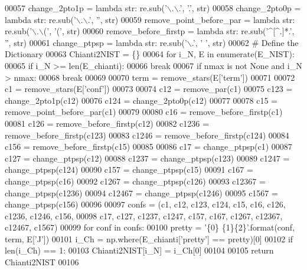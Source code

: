 \begin{DoxyCode}
00057     change\_2pto1p = \textcolor{keyword}{lambda} str: re.sub(\textcolor{stringliteral}{'\(\backslash\).\(\backslash\).'}, \textcolor{stringliteral}{'.'}, str)
00058     change\_2pto0p = \textcolor{keyword}{lambda} str: re.sub(\textcolor{stringliteral}{'\(\backslash\).\(\backslash\).'}, \textcolor{stringliteral}{''}, str)
00059     remove\_point\_before\_par = \textcolor{keyword}{lambda} str: re.sub(\textcolor{stringliteral}{'\(\backslash\).\(\backslash\)('}, \textcolor{stringliteral}{'('}, str)
00060     remove\_before\_firstp = \textcolor{keyword}{lambda} str: re.sub(\textcolor{stringliteral}{'^[^.]*.'}, \textcolor{stringliteral}{''}, str)
00061     change\_ptpsp = \textcolor{keyword}{lambda} str: re.sub(\textcolor{stringliteral}{'\(\backslash\).'}, \textcolor{stringliteral}{' '}, str)
00062     \textcolor{comment}{# Define the Dictionary}
00063     Chianti2NIST = \{\}
00064     \textcolor{keywordflow}{for} i\_N, E \textcolor{keywordflow}{in} enumerate(E\_NIST):
00065         \textcolor{keywordflow}{if} i\_N >= len(E\_chianti):
00066             \textcolor{keywordflow}{break}
00067         \textcolor{keywordflow}{if} nmax \textcolor{keywordflow}{is} \textcolor{keywordflow}{not} \textcolor{keywordtype}{None} \textcolor{keywordflow}{and} i\_N > nmax:
00068             \textcolor{keywordflow}{break}
00069         
00070         term = remove\_stars(E[\textcolor{stringliteral}{'term'}])
00071 
00072         c1 = remove\_stars(E[\textcolor{stringliteral}{'conf'}])
00073         
00074         c12 = remove\_par(c1)
00075         c123 = change\_2pto1p(c12)
00076         c124 = change\_2pto0p(c12)
00077         
00078         c15 = remove\_point\_before\_par(c1) 
00079         
00080         c16 = remove\_before\_firstp(c1)
00081         c126 = remove\_before\_firstp(c12)
00082         c1236 = remove\_before\_firstp(c123)
00083         c1246 = remove\_before\_firstp(c124)
00084         c156 = remove\_before\_firstp(c15)
00085         
00086         c17 = change\_ptpsp(c1)
00087         c127 = change\_ptpsp(c12)
00088         c1237 = change\_ptpsp(c123)
00089         c1247 = change\_ptpsp(c124)
00090         c157 = change\_ptpsp(c15)
00091         c167 = change\_ptpsp(c16)
00092         c1267 = change\_ptpsp(c126)
00093         c12367 = change\_ptpsp(c1236)
00094         c12467 = change\_ptpsp(c1246)
00095         c1567 = change\_ptpsp(c156)
00096        
00097         confs = (c1, c12, c123, c124, c15, c16, c126, c1236, c1246, c156,
00098                  c17, c127, c1237, c1247, c157, c167, c1267, c12367, c12467, c1567)
00099         \textcolor{keywordflow}{for} conf \textcolor{keywordflow}{in} confs:   
00100             pretty = \textcolor{stringliteral}{'\{0\} \{1\}\{2\}'}.format(conf, term, E[\textcolor{stringliteral}{'J'}])
00101             i\_Ch = np.where(E\_chianti[\textcolor{stringliteral}{'pretty'}] == pretty)[0]
00102             \textcolor{keywordflow}{if} len(i\_Ch) == 1:
00103                 Chianti2NIST[i\_N] = i\_Ch[0]
00104                         
00105     \textcolor{keywordflow}{return} Chianti2NIST
00106         
\end{DoxyCode}

